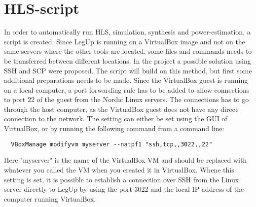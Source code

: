 \section{HLS-script}
In order to automatically run HLS, simulation, synthesis and power-estimation, a script is created. Since LegUp is running on a VirtualBox image and not on the same servers where the other tools are located, some files and commands needs to be transferred between different locations. In the project \cite{holm2015pro} a possible solution using SSH and SCP were proposed. The script will build on this method, but first some additional preparations needs to be made. Since the VirtualBox guest is running on a local computer, a port forwarding rule has to be added to allow connections to port 22 of the guest from the Nordic Linux servers. The connections has to go through the host computer, as the VirtualBox guest does not have any direct connection to the network. The setting can either be set using the GUI of VirtualBox, or by running the following command from a command line:
\begin{verbatim}
  VBoxManage modifyvm myserver --natpf1 "ssh,tcp,,3022,,22"  
\end{verbatim}
Here "myserver" is the name of the VirtualBox VM and should be replaced with whatever you called the VM when you created it in VirtualBox. Whene this setting is set, it is possible to establish a connection over SSH from the Linux server directly to LegUp by using the port 3022 and the local IP-address of the computer running VirtualBox.
\lstset{language=[gnu] make, style=Cstyle}

